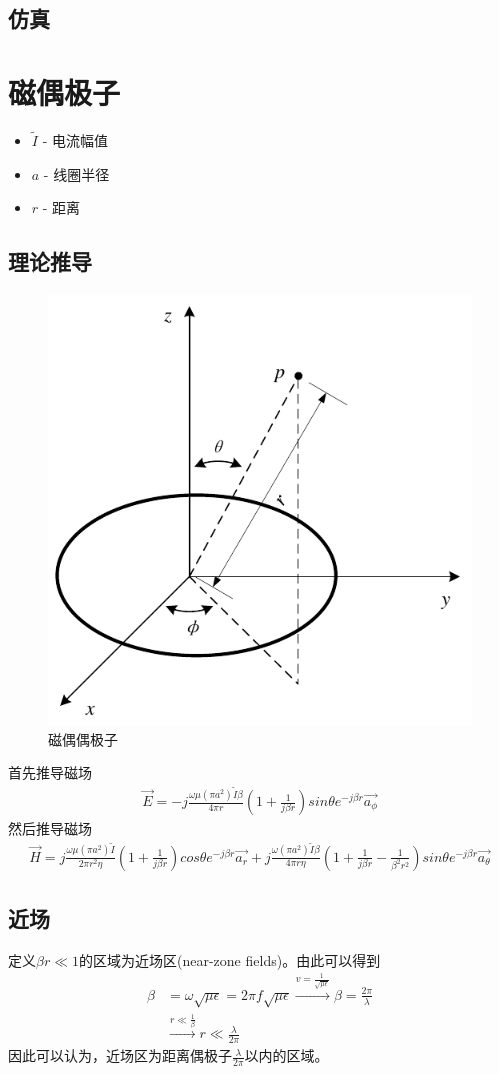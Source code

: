 \documentclass[lang=cn,11pt]{elegantpaper}
\begin{document}
\subsection{仿真}

\section{磁偶极子}
\begin{itemize}
  \item $\widetilde{I}$ - 电流幅值
  \item $a$ - 线圈半径
  \item $r$ - 距离
\end{itemize}
\subsection{理论推导}
\begin{figure}[ht]
  \centering
  \includegraphics[width=0.3\linewidth]{figure//Magnetic_Dipole.pdf}
  \vspace{-0.3cm}
  \caption{磁偶偶极子}\label{fig:Magnetic_Dipole}
\end{figure}
首先推导磁场
\begin{equation}
  \begin{aligned}
    \vec{E} = -j\frac{\omega \mu (\pi a^2)\widetilde{I}\beta}{4\pi r}\left(1+\frac{1}{j\beta r}\right)sin\theta e^{-j\beta r}\vec{a_{\phi}}
\end{aligned}
\end{equation}
然后推导磁场
\begin{equation}
  \begin{aligned}
    \vec{H} = j\frac{\omega \mu (\pi a^2)\widetilde{I}}{2\pi r^2\eta}\left(1+\frac{1}{j\beta r}\right)cos\theta e^{-j\beta r}\vec{a_r} + j\frac{\omega (\pi a^2)\widetilde{I}\beta}{4\pi r \eta}\left(1+\frac{1}{j\beta r} - \frac{1}{{\beta}^2 r^2}\right)sin\theta e^{-j\beta r}\vec{a_{\theta}}
\end{aligned}
\end{equation}

\subsection{近场}
定义$\beta r \ll 1$的区域为近场区(near-zone fields)。由此可以得到
\begin{equation}
  \begin{aligned}
    \beta &= \omega\sqrt{\mu \epsilon} = 2\pi f \sqrt{\mu \epsilon} \xrightarrow{v = \frac{1}{\sqrt{\mu \epsilon}}} \beta = \frac{2\pi}{\lambda} \\
    &\xrightarrow{r\ll \frac{1}{\beta}} r\ll \frac{\lambda}{2\pi}
  \end{aligned}
\end{equation}
因此可以认为，近场区为距离偶极子$\frac{\lambda}{2\pi}$以内的区域。

\nocite{*}


\end{document}
